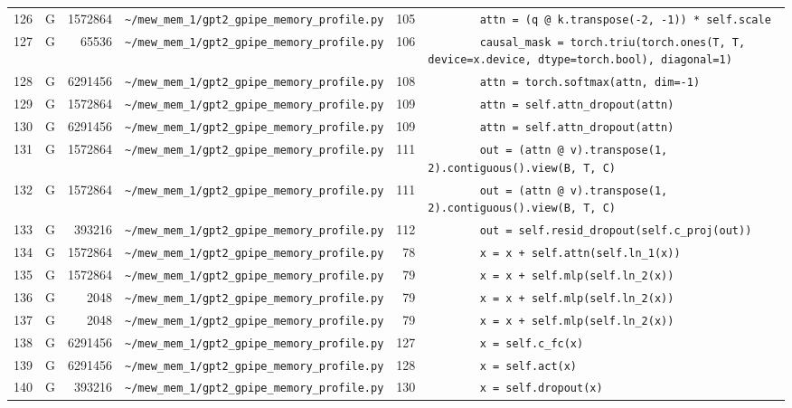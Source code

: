 \documentclass{article}
\begin{document}
\begin{longtable}{r l r p{6.5cm} r p{7.0cm}}
126 & G & 1572864 & \lstinline|~/mew_mem_1/gpt2_gpipe_memory_profile.py| & 105 & \lstinline|        attn = (q @ k.transpose(-2, -1)) * self.scale| \\
127 & G & 65536 & \lstinline|~/mew_mem_1/gpt2_gpipe_memory_profile.py| & 106 & \lstinline|        causal_mask = torch.triu(torch.ones(T, T, device=x.device, dtype=torch.bool), diagonal=1)| \\
128 & G & 6291456 & \lstinline|~/mew_mem_1/gpt2_gpipe_memory_profile.py| & 108 & \lstinline|        attn = torch.softmax(attn, dim=-1)| \\
129 & G & 1572864 & \lstinline|~/mew_mem_1/gpt2_gpipe_memory_profile.py| & 109 & \lstinline|        attn = self.attn_dropout(attn)| \\
130 & G & 6291456 & \lstinline|~/mew_mem_1/gpt2_gpipe_memory_profile.py| & 109 & \lstinline|        attn = self.attn_dropout(attn)| \\
131 & G & 1572864 & \lstinline|~/mew_mem_1/gpt2_gpipe_memory_profile.py| & 111 & \lstinline|        out = (attn @ v).transpose(1, 2).contiguous().view(B, T, C)| \\
132 & G & 1572864 & \lstinline|~/mew_mem_1/gpt2_gpipe_memory_profile.py| & 111 & \lstinline|        out = (attn @ v).transpose(1, 2).contiguous().view(B, T, C)| \\
133 & G & 393216 & \lstinline|~/mew_mem_1/gpt2_gpipe_memory_profile.py| & 112 & \lstinline|        out = self.resid_dropout(self.c_proj(out))| \\
134 & G & 1572864 & \lstinline|~/mew_mem_1/gpt2_gpipe_memory_profile.py| & 78 & \lstinline|        x = x + self.attn(self.ln_1(x))| \\
135 & G & 1572864 & \lstinline|~/mew_mem_1/gpt2_gpipe_memory_profile.py| & 79 & \lstinline|        x = x + self.mlp(self.ln_2(x))| \\
136 & G & 2048 & \lstinline|~/mew_mem_1/gpt2_gpipe_memory_profile.py| & 79 & \lstinline|        x = x + self.mlp(self.ln_2(x))| \\
137 & G & 2048 & \lstinline|~/mew_mem_1/gpt2_gpipe_memory_profile.py| & 79 & \lstinline|        x = x + self.mlp(self.ln_2(x))| \\
138 & G & 6291456 & \lstinline|~/mew_mem_1/gpt2_gpipe_memory_profile.py| & 127 & \lstinline|        x = self.c_fc(x)| \\
139 & G & 6291456 & \lstinline|~/mew_mem_1/gpt2_gpipe_memory_profile.py| & 128 & \lstinline|        x = self.act(x)| \\
140 & G & 393216 & \lstinline|~/mew_mem_1/gpt2_gpipe_memory_profile.py| & 130 & \lstinline|        x = self.dropout(x)| \\

\end{longtable}
\end{document}
